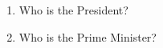 %
%
  \begin{enumerate}
    \item Who is the President?
    \item Who is the Prime Minister?
  \end{enumerate}
